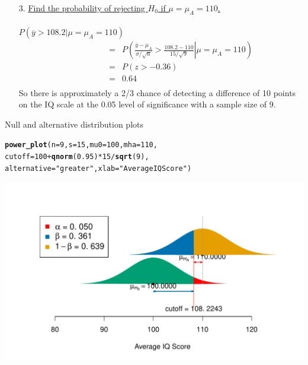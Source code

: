\documentclass[10pt,handout]{beamer}\usepackage[]{graphicx}\usepackage[]{color}
\makeatletter
\def\maxwidth{ %
  \ifdim\Gin@nat@width>\linewidth
    \linewidth
  \else
    \Gin@nat@width
  \fi
}
\newcommand{\hlnum}[1]{\textcolor[rgb]{0.686,0.059,0.569}{#1}}%
\newcommand{\hlstr}[1]{\textcolor[rgb]{0.192,0.494,0.8}{#1}}%
\newcommand{\hlopt}[1]{\textcolor[rgb]{0,0,0}{#1}}%
\newcommand{\hlstd}[1]{\textcolor[rgb]{0.345,0.345,0.345}{#1}}%
\newcommand{\hlkwc}[1]{\textcolor[rgb]{0.333,0.667,0.333}{#1}}%
\newcommand{\hlkwd}[1]{\textcolor[rgb]{0.737,0.353,0.396}{\textbf{#1}}}%
\newenvironment{kframe}{%
 \def\at@end@of@kframe{}%
 \ifinner\ifhmode%
  \def\at@end@of@kframe{\end{minipage}}%
  \begin{minipage}{\columnwidth}%
 \fi\fi%
 \def\FrameCommand##1{\hskip\@totalleftmargin \hskip-\fboxsep
 \colorbox{shadecolor}{##1}\hskip-\fboxsep
     \hskip-\linewidth \hskip-\@totalleftmargin \hskip\columnwidth}%
 \MakeFramed {\advance\hsize-\width
   \@totalleftmargin\z@ \linewidth\hsize
   \@setminipage}}%
 {\par\unskip\endMakeFramed%
 \at@end@of@kframe}
\newenvironment{knitrout}{}{} %
\makeatother
\begin{document}
{	\begin{enumerate}
		\item[3.] \underline{Find the probability of rejecting $H_0$ if
			$\mu=\mu_A=110$.}\\ \ \\
		$P(\overline{y} > 108.2|\mu=\mu_A=110) $
		\begin{eqnarray*} \qquad \qquad & = &
			P\left(\left.\frac{\overline{y}-\mu_A}{\sigma/\sqrt{n}}
			> \frac{108.2-110}{15/\sqrt{9}}\right|\mu=\mu_A=110\right)\\
			& = & P\left(z > -0.36\right)\\
			& = & 0.64\\
		\end{eqnarray*}
		So there is approximately a 2/3 chance of detecting a difference of
		10 points on the IQ scale at the 0.05 level of significance with a
		sample size of 9.
	\end{enumerate}
} 


\begin{frame}[fragile]{Null and alternative distribution plots}
\begin{knitrout}\tiny
{}\color{fgcolor}\begin{kframe}
\begin{alltt}
\hlkwd{power_plot}\hlstd{(}\hlkwc{n} \hlstd{=} \hlnum{9}\hlstd{,} \hlkwc{s} \hlstd{=} \hlnum{15}\hlstd{,} \hlkwc{mu0} \hlstd{=} \hlnum{100}\hlstd{,} \hlkwc{mha} \hlstd{=} \hlnum{110}\hlstd{,}
\hlkwc{cutoff} \hlstd{=} \hlnum{100} \hlopt{+} \hlkwd{qnorm}\hlstd{(}\hlnum{0.95}\hlstd{)} \hlopt{*} \hlnum{15} \hlopt{/} \hlkwd{sqrt}\hlstd{(}\hlnum{9}\hlstd{),}
\hlkwc{alternative} \hlstd{=} \hlstr{"greater"}\hlstd{,} \hlkwc{xlab} \hlstd{=} \hlstr{"Average IQ Score"}\hlstd{)}
\end{alltt}
\end{kframe}

{\centering \includegraphics[width=\maxwidth]{figure/unnamed-chunk-18-1} 

}



\end{knitrout}
\end{frame}
\end{document}
